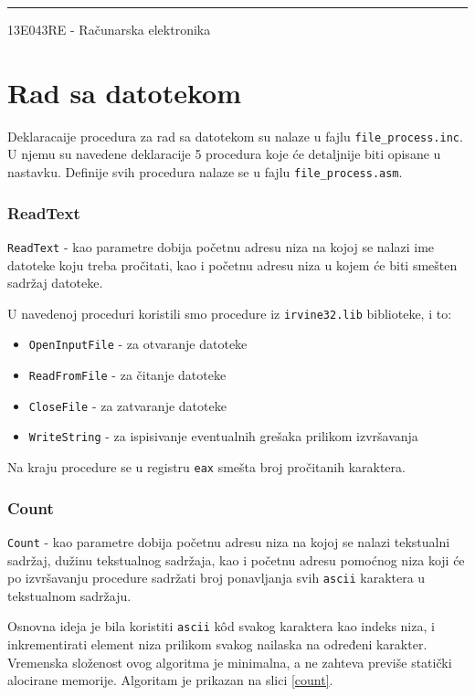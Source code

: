 \documentclass[a4paper, 12pt]{article}
\newcommand{\btmline}{
\vfill
\rule{0.9\textwidth}{0.4mm}
\begin{center}
13E043RE - Računarska elektronika
\end{center}}
\begin{document}
\btmline\newpage

\section*{Rad sa datotekom}

Deklaracaije procedura za rad sa datotekom su nalaze u fajlu \verb|file_process.inc|. U njemu su navedene deklaracije 5 procedura koje će detaljnije biti opisane u nastavku. Definije svih procedura nalaze se u fajlu \verb|file_process.asm|.

\subsubsection*{\textsf{ReadText}}

\verb|ReadText| - kao parametre dobija početnu adresu niza na kojoj se nalazi ime datoteke koju treba pročitati, kao i početnu adresu niza u kojem će biti smešten sadržaj datoteke. 

U navedenoj proceduri koristili smo procedure iz \verb|irvine32.lib| biblioteke, i to: 
\begin{itemize}
\setlength\itemsep{0.1em}
\item \verb|OpenInputFile| - za otvaranje datoteke
\item \verb|ReadFromFile| - za čitanje datoteke
\item \verb|CloseFile| - za zatvaranje datoteke
\item \verb|WriteString| - za ispisivanje eventualnih grešaka prilikom izvršavanja
\end{itemize}
Na kraju procedure se u registru \verb|eax| smešta broj pročitanih karaktera.

\subsubsection*{\textsf{Count}}

\verb|Count| - kao parametre dobija početnu adresu niza na kojoj se nalazi tekstualni sadržaj, dužinu tekstualnog sadržaja, kao i početnu adresu pomoćnog niza koji će po izvršavanju procedure sadržati broj ponavljanja svih \verb|ascii| karaktera u tekstualnom sadržaju.

Osnovna ideja je bila koristiti \verb|ascii| k\^ od svakog karaktera kao indeks niza, i inkrementirati element niza prilikom svakog nailaska na određeni karakter. Vremenska složenost ovog algoritma je minimalna, a ne zahteva previše statički alocirane memorije. Algoritam je prikazan na slici \ref{count}.
\end{document}
